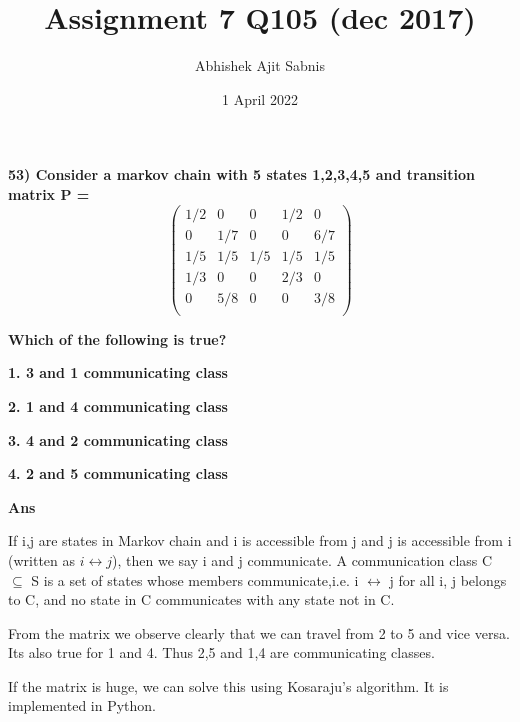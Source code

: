 \documentclass{article}
\title{\textbf{Assignment 7 Q105 (dec 2017)}}
\author{Abhishek Ajit Sabnis}
\date{1 April 2022}
\begin{document}
\maketitle

\textbf{53) Consider a markov chain with 5 states {1,2,3,4,5} and transition matrix P = }
\begin{equation}
\begin{pmatrix}
1/2 & 0 & 0 & 1/2 & 0\\
0 & 1/7 & 0 & 0 & 6/7\\
1/5 & 1/5 & 1/5 & 1/5 & 1/5\\
1/3 & 0 & 0 & 2/3 & 0\\
0 & 5/8 & 0 & 0 & 3/8\\
\end{pmatrix}
\end{equation}

\vspace{0.3cm}

\textbf{Which of the following is true? }

\textbf{1. 3 and 1 communicating class}

\textbf{2. 1 and 4 communicating class}

\textbf{3. 4 and 2 communicating class}

\textbf{4. 2 and 5 communicating class}
\vspace{0.5cm}

\textbf{Ans} 

If i,j are states in Markov chain and i is accessible from j and j is accessible from i (written as    $i\leftrightarrow j$), then we say i and j communicate. A communication class C $\subseteq$ S is a set of states whose members communicate,i.e. i $\leftrightarrow$ j for all i, j belongs to C, and no state in C communicates with any state not in C.

From the matrix we observe clearly that we can travel from 2 to 5 and vice versa. Its also true for 1 and 4. Thus {2,5} and {1,4} are communicating classes. 


If the matrix is huge, we can solve this using Kosaraju's algorithm. It is implemented in Python.
\end{document}
